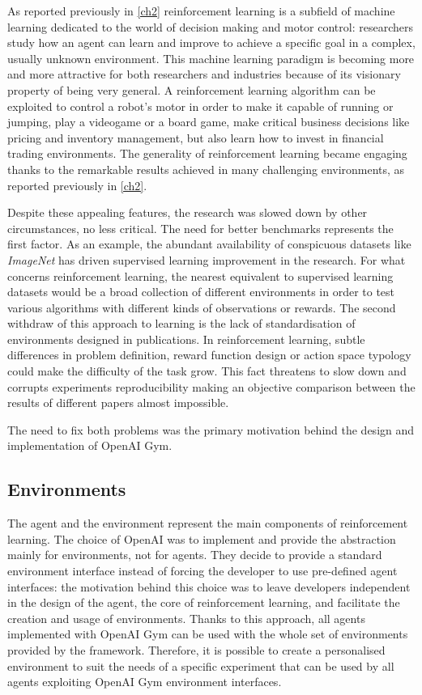 As reported previously in  \vref{ch2} reinforcement learning is a subfield of machine learning dedicated to the world of decision making and motor control: researchers study how an agent can learn and improve to achieve a specific goal in a complex, usually unknown environment. This machine learning paradigm is becoming more and more attractive for both researchers and industries because of its visionary property of being very general. A reinforcement learning algorithm can be exploited to control a robot's motor in order to make it capable of running or jumping, play a videogame or a board game, make critical business decisions like pricing and inventory management, but also learn how to invest in financial trading environments. The generality of reinforcement learning became engaging thanks to the remarkable results achieved in many challenging environments, as reported previously in \vref{ch2}.

Despite these appealing features, the research was slowed down by other circumstances, no less critical.
The need for better benchmarks represents the first factor. As an example, the abundant availability of conspicuous datasets like \textit{ImageNet} \cite{deng2009imagenet} has driven supervised learning improvement in the research. For what concerns reinforcement learning, the nearest equivalent to supervised learning datasets would be a broad collection of different environments in order to test various algorithms with different kinds of observations or rewards.
The second withdraw of this approach to learning is the lack of standardisation of environments designed in publications. In reinforcement learning, subtle differences in problem definition, reward function design or action space typology could make the difficulty of the task grow.  This fact threatens to slow down and corrupts experiments reproducibility making an objective comparison between the results of different papers almost impossible.

The need to fix both problems was the primary motivation behind the design and implementation of OpenAI Gym.

\subsection{Environments}

The agent and the environment represent the main components of reinforcement learning. The choice of OpenAI was to implement and provide the abstraction mainly for environments, not for agents. They decide to provide a standard environment interface instead of forcing the developer to use pre-defined agent interfaces: the motivation behind this choice was to leave developers independent in the design of the agent, the core of reinforcement learning, and facilitate the creation and usage of environments. Thanks to this approach, all agents implemented with OpenAI Gym can be used with the whole set of environments provided by the framework. Therefore, it is possible to create a personalised environment to suit the needs of a specific experiment that can be used by all agents exploiting OpenAI Gym environment interfaces.

